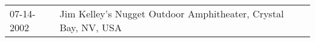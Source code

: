 \begin{supertabular}{ll}
 07-14-2002 &  Jim Kelley's Nugget Outdoor Amphitheater, Crystal Bay, NV, USA \\
\end{supertabular}
